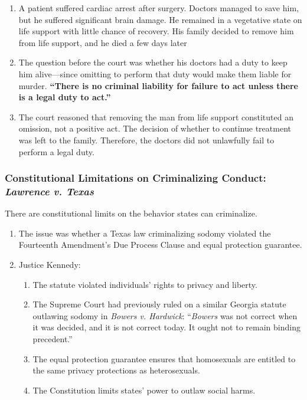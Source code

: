 \begin{enumerate}
    \item A patient suffered cardiac arrest after surgery. Doctors managed to 
    save him, but he suffered significant brain damage. He remained in a 
    vegetative state on life support with little chance of recovery. His 
    family decided to remove him from life support, and he died a few days 
    later
    \item The question before the court was whether his doctors had a duty to 
    keep him alive---since omitting to perform that duty would make them 
    liable for murder. \textbf{``There is no criminal liability for failure to 
    act unless there is a legal duty to act.''}
    \item The court reasoned that removing the man from life support 
    constituted an omission, not a positive act. The decision of whether to 
    continue treatment was left to the family. Therefore, the doctors did not 
    unlawfully fail to perform a legal duty.
\end{enumerate}

\subsubsection{Constitutional Limitations on Criminalizing Conduct: 
\emph{Lawrence v. Texas}}

There are constitutional limits on the behavior states can criminalize.

\begin{enumerate}
    \item The issue was whether a Texas law criminalizing sodomy violated the 
    Fourteenth Amendment's Due Process Clause and equal protection guarantee.
    \item Justice Kennedy:
    \begin{enumerate}
        \item The statute violated individuals' rights to privacy and liberty.
        \item The Supreme Court had previously ruled on a similar Georgia 
        statute outlawing sodomy in \emph{Bowers v. Hardwick}: ``\emph{Bowers} 
        was not correct when it was decided, and it is not correct today. It 
        ought not to remain binding precedent.''
        \item The equal protection guarantee ensures that homosexuals are 
        entitled to the same privacy protections as heterosexuals.
        \item The Constitution limits states' power to outlaw social harms.
    \end{enumerate}
\end{enumerate}

